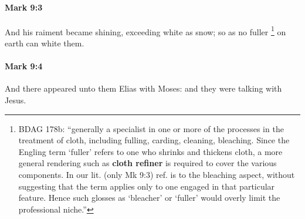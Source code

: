 		\paragraph{Mark 9:3} %
			\label{MARK-9-3}

			And his raiment became shining, exceeding white as snow; so as no fuller%
				\footnote{%
					BDAG 178b: ``generally a specialist in one or more of the processes in the treatment of cloth, including fulling, carding, cleaning, bleaching. Since the Engling term `fuller' refers to one who shrinks and thickens cloth, a more general rendering such as \textbf{cloth refiner} is required to cover the various components. In our lit. (only Mk 9:3) ref. is to the bleaching aspect, without suggesting that the term applies only to one engaged in that particular feature. Hence such glosses as `bleacher' or `fuller' would overly limit the professional niche.''
					}
			on earth can white them.

			\begin{framed}
			\scriptsize
				\begin{compactdesc}
					\item[SBLG] 
				\end{compactdesc}
			\end{framed}

		\paragraph{Mark 9:4} %
			\label{MARK-9-4}

			And there appeared unto them Elias with Moses: and they were talking with Jesus.

